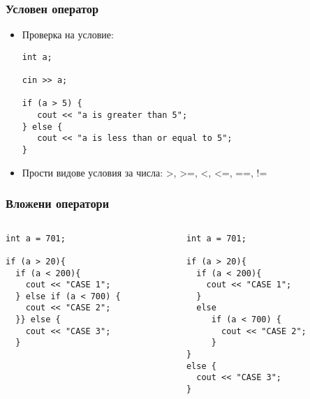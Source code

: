\documentclass{beamer}
\begin{document}
\begin{frame}[fragile]
\frametitle{Условен оператор}
\begin{itemize}
\item Проверка на условие:
\begin{lstlisting}
int a;

cin >> a;

if (a > 5) {
   cout << "a is greater than 5";
} else {
   cout << "a is less than or equal to 5";
}
\end{lstlisting}
\item Прости видове условия за числа: >, >=, <, <=, ==, !=
\end{itemize}

\end{frame}

\begin{frame}[fragile]
\frametitle{Вложени оператори}



\begin{columns}
  \begin{column}{0.5\textwidth}
  \begin{lstlisting}
int a = 701;

if (a > 20){
  if (a < 200){
    cout << "CASE 1";
  } else if (a < 700) {
    cout << "CASE 2";
  }} else {
    cout << "CASE 3";
  }


\end{lstlisting}
  \end{column}

\pause

  \begin{column}{0.5\textwidth}
  \begin{lstlisting}
int a = 701;

if (a > 20){
  if (a < 200){
    cout << "CASE 1";
  }
  else
     if (a < 700) {
       cout << "CASE 2";
     }
}
else {
  cout << "CASE 3";
}
\end{lstlisting}
  \end{column}
\end{columns}



\end{frame}
\end{document}
